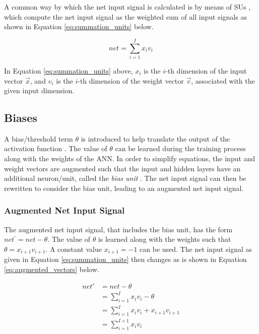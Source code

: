 A common way by which the net input signal is calculated is by means of \acp{SU} \cite{ref:engelbrecht:2007}, which compute the net input signal as the weighted sum of all input signals as shown in Equation \eqref{eq:summation_units} below.

\begin{equation}
    net = \sum_{i=1}^{I}{x_{i}v_{i}}
    \label{eq:summation_units}
\end{equation}

\noindent
In Equation \eqref{eq:summation_units} above, $x_{i}$ is the $i$-th dimension of the input vector $\vec{x}$, and $v_{i}$ is the $i$-th dimension of the weight vector $\vec{v}$, associated with the given input dimension.


\subsection{Biases}\label{sec:anns:an:biases}

A bias/threshold term $\theta$ is introduced to help translate the output of the activation function \cite{ref:benitez:1997}. The value of $\theta$ can be learned during the training process along with the weights of the \ac{ANN}. In order to simplify equations, the input and weight vectors are augmented such that the input and hidden layers have an additional neuron/unit, called the \textit{bias unit} \cite{ref:engelbrecht:2007}. The net input signal can then be rewritten to consider the bias unit, leading to an augmented net input signal.


\subsubsection{Augmented Net Input Signal}\label{sec:anns:an:biases:augmented_net_input_signal}

The augmented net input signal, that includes the bias unit, has the form $net^{'} = net - \theta$. The value of $\theta$ is learned along with the weights such that $\theta = x_{i+1}v_{i+1}$. A constant value $x_{i+1} = -1$ can be used. The net input signal as given in Equation \eqref{eq:summation_units} then changes as is shown in Equation \eqref{eq:augmented_vectors} below.

\begin{equation}
    \begin{split}
        net{'} & = net - \theta \\
        & = \sum_{i=1}^{I} x_i v_i - \theta\\
        & = \sum_{i=1}^{I} x_i v_i + x_{i+1} v_{i+1} \\
        & = \sum_{i=1}^{I+1} x_i v_i
        \label{eq:augmented_vectors}
    \end{split}
\end{equation}


